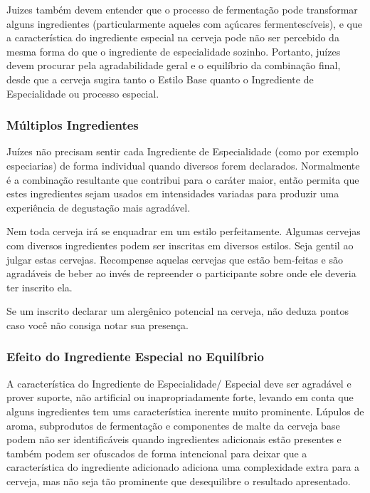 Juizes também devem entender que o processo de fermentação pode transformar alguns ingredientes (particularmente aqueles com açúcares fermentescíveis), e que a característica do ingrediente especial na cerveja pode não ser percebido da mesma forma do que o ingrediente de especialidade sozinho. Portanto, juízes devem procurar pela agradabilidade geral e o equilíbrio da combinação final, desde que a cerveja sugira tanto o Estilo Base quanto o Ingrediente de Especialidade ou processo especial.
\subsubsection*{Múltiplos Ingredientes}
Juízes não precisam sentir cada Ingrediente de Especialidade (como por exemplo especiarias) de forma individual quando diversos forem declarados. Normalmente é a combinação resultante que contribui para o caráter maior, então permita que estes ingredientes sejam usados em intensidades variadas para produzir uma experiência de degustação mais agradável.

Nem toda cerveja irá se enquadrar em um estilo perfeitamente. Algumas cervejas com diversos ingredientes podem ser inscritas em diversos estilos. Seja gentil ao julgar estas cervejas. Recompense aquelas cervejas que estão bem-feitas e são agradáveis de beber ao invés de repreender o participante sobre onde ele deveria ter inscrito ela.

Se um inscrito declarar um alergênico potencial na cerveja, não deduza pontos caso você não consiga notar sua presença.

\subsubsection*{Efeito do Ingrediente Especial no Equilíbrio}
A característica do Ingrediente de Especialidade/ Especial deve ser agradável e prover suporte, não artificial ou inapropriadamente forte, levando em conta que alguns ingredientes tem ums característica inerente muito prominente.  Lúpulos de aroma, subprodutos de fermentação e componentes de malte da cerveja base podem não ser identificáveis quando ingredientes adicionais estão presentes e também podem ser ofuscados de forma intencional para deixar que a característica do ingrediente adicionado adiciona uma complexidade extra para a cerveja, mas não seja tão prominente que desequilibre o resultado apresentado.